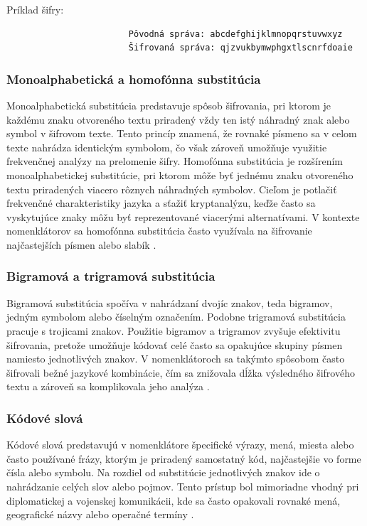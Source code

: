                 Príklad šifry:
                
                    \begin{verbatim}
                        Pôvodná správa: abcdefghijklmnopqrstuvwxyz
                        Šifrovaná správa: qjzvukbymwphgxtlscnrfdoaie
                    \end{verbatim}
            \subsubsection{Monoalphabetická a homofónna substitúcia}
                Monoalphabetická substitúcia predstavuje spôsob šifrovania, pri ktorom je každému znaku otvoreného textu priradený vždy ten istý náhradný znak alebo symbol v šifrovom texte. Tento princíp znamená, že rovnaké písmeno sa v celom texte nahrádza identickým symbolom, čo však zároveň umožňuje využitie frekvenčnej analýzy na prelomenie šifry.
                Homofónna substitúcia je rozšírením monoalphabetickej substitúcie, pri ktorom môže byť jednému znaku otvoreného textu priradených viacero rôznych náhradných symbolov. Cieľom je potlačiť frekvenčné charakteristiky jazyka a sťažiť kryptanalýzu, keďže často sa vyskytujúce znaky môžu byť reprezentované viacerými alternatívami.
                V kontexte nomenklátorov sa homofónna substitúcia často využívala na šifrovanie najčastejších písmen alebo slabík \cite{kahn1996codebreakers}.
            \subsubsection{Bigramová a trigramová substitúcia}
                Bigramová substitúcia spočíva v nahrádzaní dvojíc znakov, teda bigramov, jedným symbolom alebo číselným označením. Podobne trigramová substitúcia pracuje s trojicami znakov.
                Použitie bigramov a trigramov zvyšuje efektivitu šifrovania, pretože umožňuje kódovať celé často sa opakujúce skupiny písmen namiesto jednotlivých znakov. V nomenklátoroch sa takýmto spôsobom často šifrovali bežné jazykové kombinácie, čím sa znižovala dĺžka výsledného šifrového textu a zároveň sa komplikovala jeho analýza \cite{kahn1996codebreakers}.
            \subsubsection{Kódové slová}
                Kódové slová predstavujú v nomenklátore špecifické výrazy, mená, miesta alebo často používané frázy, ktorým je priradený samostatný kód, najčastejšie vo forme čísla alebo symbolu.
                Na rozdiel od substitúcie jednotlivých znakov ide o nahrádzanie celých slov alebo pojmov. Tento prístup bol mimoriadne vhodný pri diplomatickej a vojenskej komunikácii, kde sa často opakovali rovnaké mená, geografické názvy alebo operačné termíny \cite{kahn1996codebreakers}.
